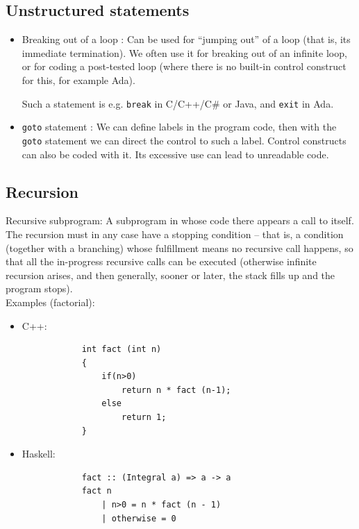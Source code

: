 \documentclass[margin=0px]{article}
\begin{document}
\begin{itemize}
\begin{itemize}
          \end{itemize}
\end{itemize}

\subsection{Unstructured statements}

\begin{itemize}
    \item	Breaking out of a loop : Can be used for ``jumping out'' of a loop (that is, its immediate termination).
          We often use it for breaking out of an infinite loop, or for coding a post-tested loop (where there is no
          built-in control construct for this, for example Ada).

          Such a statement is e.g. \texttt{break} in C/C++/C\# or Java, and \texttt{exit} in Ada.

    \item	\texttt{goto} statement : We can define labels in the program code, then with the \texttt{goto} statement we can direct
          the control to such a label. Control constructs can also be coded with it. Its excessive
          use can lead to unreadable code.
\end{itemize}

\subsection{Recursion}

Recursive subprogram: A subprogram in whose code there appears a call to itself.
The recursion must in any case have a stopping condition -- that is, a condition (together with a branching)
whose fulfillment means no recursive call happens, so that all the in-progress recursive calls
can be executed (otherwise infinite recursion arises, and then generally, sooner or later, the stack fills up and the program stops).\\

\noindent Examples (factorial):

\begin{itemize}
    \item	C++:
          \begin{verbatim}
            int fact (int n)
            {
                if(n>0)
                    return n * fact (n-1);
                else
                    return 1;
            }
        \end{verbatim}

    \item	Haskell:
          \begin{verbatim}
            fact :: (Integral a) => a -> a
            fact n
                | n>0 = n * fact (n - 1)
                | otherwise = 0
        \end{verbatim}

\end{itemize}
\end{document}

